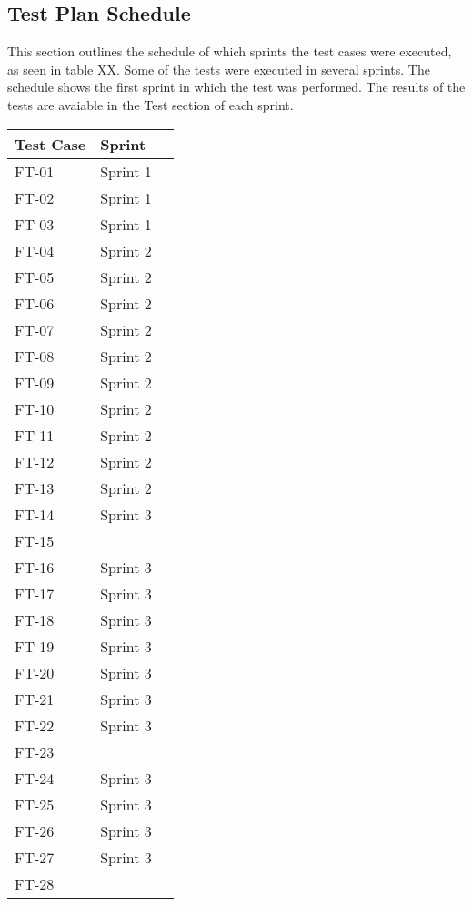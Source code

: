 \subsection{Test Plan Schedule}

This section outlines the schedule of which sprints the test cases were executed, as seen in table XX. Some of the tests were executed in several sprints. The schedule shows the first sprint in which the test was performed. The results of the tests are avaiable in the Test section of each sprint.


\begin{tabular}{| l | l | l |}
	\hline
	\rowcolor{lightgray}
	{\bf Test Case} & {\bf Sprint} \\ \hline
	FT-01 & Sprint 1 \\
	FT-02 & Sprint 1 \\ 
	FT-03 & Sprint 1 \\ \hline
	FT-04 & Sprint 2 \\ 
	FT-05 & Sprint 2 \\ 
	FT-06 & Sprint 2 \\ 
	FT-07 & Sprint 2 \\ 
	FT-08 & Sprint 2 \\ 
	FT-09 & Sprint 2 \\ 
	FT-10 & Sprint 2 \\ 
	FT-11 & Sprint 2 \\ 
	FT-12 & Sprint 2 \\ 
	FT-13 & Sprint 2 \\ \hline
	FT-14 & Sprint 3 \\ \hline
	FT-15 & \\ \hline
	FT-16 & Sprint 3 \\
	FT-17 & Sprint 3 \\
	FT-18 & Sprint 3 \\
	FT-19 & Sprint 3 \\
	FT-20 & Sprint 3 \\
	FT-21 & Sprint 3 \\
	FT-22 & Sprint 3 \\
	FT-23 & \\ \hline
	FT-24 & Sprint 3 \\
	FT-25 & Sprint 3 \\ 
	FT-26 & Sprint 3 \\
	FT-27 & Sprint 3 \\ \hline
	FT-28 & \\ \hline
\end{tabular}